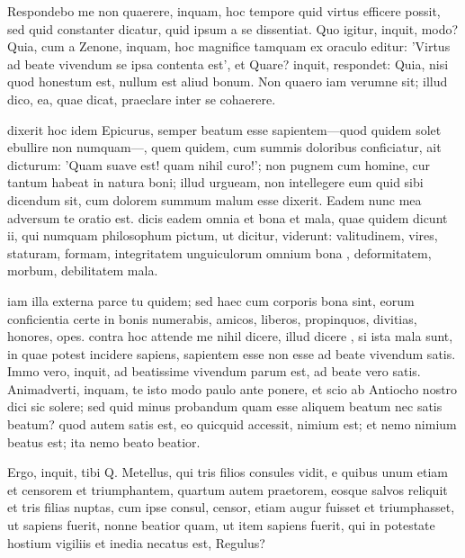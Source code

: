  Respondebo me non quaerere, inquam, hoc tempore quid virtus efficere possit, sed quid constanter dicatur, quid ipsum a se dissentiat. Quo igitur, inquit, modo? Quia, cum a Zenone, inquam, hoc magnifice tamquam ex oraculo editur: 'Virtus ad beate vivendum se ipsa contenta est', et Quare? inquit, respondet: Quia, nisi quod honestum est, nullum est aliud bonum. Non quaero iam verumne sit; illud dico, ea, quae dicat, praeclare inter se cohaerere.

 dixerit hoc idem Epicurus, semper beatum esse sapientem—quod quidem solet ebullire non numquam—, quem quidem, cum summis doloribus conficiatur, ait dicturum: 'Quam suave est! quam nihil curo!'; non pugnem cum homine, cur tantum habeat in natura boni; illud urgueam, non intellegere eum quid sibi dicendum sit, cum dolorem summum malum esse dixerit. Eadem nunc mea adversum te oratio est. dicis eadem omnia et bona et mala, quae quidem dicunt ii, qui numquam philosophum pictum, ut dicitur, viderunt: valitudinem, vires, staturam, formam, integritatem unguiculorum omnium bona , deformitatem, morbum, debilitatem mala.

 iam illa externa parce tu quidem; sed haec cum corporis bona sint, eorum conficientia certe in bonis numerabis, amicos, liberos, propinquos, divitias, honores, opes. contra hoc attende me nihil dicere, illud dicere , si ista mala sunt, in quae potest incidere sapiens, sapientem esse non esse ad beate vivendum satis. Immo vero, inquit, ad beatissime vivendum parum est, ad beate vero satis. Animadverti, inquam, te isto modo paulo ante ponere, et scio ab Antiocho nostro dici sic solere; sed quid minus probandum quam esse aliquem beatum nec satis beatum? quod autem satis est, eo quicquid accessit, nimium est; et nemo nimium beatus est; ita nemo beato beatior.

 Ergo, inquit, tibi Q. Metellus, qui tris filios consules vidit, e quibus unum etiam et censorem et triumphantem, quartum autem praetorem, eosque salvos reliquit et tris filias nuptas, cum ipse consul, censor, etiam augur fuisset et triumphasset, ut sapiens fuerit, nonne beatior quam, ut item sapiens fuerit, qui in potestate hostium vigiliis et inedia necatus est, Regulus?

